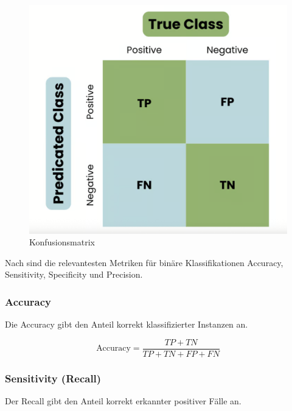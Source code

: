 \begin{figure}[htbp]
    \begin{center}
        \includegraphics[scale=0.3]{static/confusion_matrix.png}
        \caption[Konfusionsmatrix]{\label{fig:confusion_matrix} Konfusionsmatrix\footnotemark}
    \end{center}
\end{figure}

Nach \cite{Rainio:2024aa} sind die relevantesten Metriken für binäre Klassifikationen Accuracy, Sensitivity, 
Specificity und Precision. 

\subsubsection{Accuracy}

Die Accuracy gibt den Anteil korrekt klassifizierter Instanzen an.

\begin{equation}
    \text{Accuracy} = \frac{TP + TN}{TP + TN + FP + FN}
\end{equation}

\subsubsection{Sensitivity (Recall)}

Der Recall gibt den Anteil korrekt erkannter positiver Fälle an.

